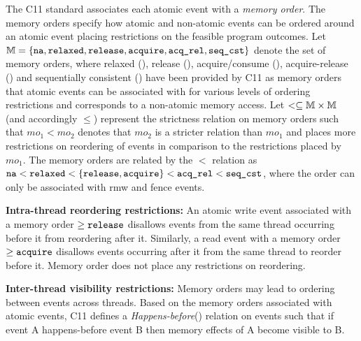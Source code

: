 The C11 standard \cite{C11} associates each atomic event with 
a {\em memory order}. The memory orders specify how atomic and
non-atomic events can be ordered around an atomic event placing
restrictions on the feasible program outcomes.
%
Let $\mathbb{M} = \{\texttt{na},\texttt{relaxed},\texttt{release},\texttt{acquire},\texttt{acq\_rel},\texttt{seq\_cst}\}$ denote the set 
of memory orders, where relaxed (\morlx), release (\morel),
acquire/consume (\moacq), acquire-release (\moar) and sequentially
consistent (\mosc) have been provided by C11 as memory orders that 
atomic events can be associated with for various levels
of ordering restrictions and \na corresponds to a non-atomic
memory access.
%
Let $< \subseteq \mathbb{M} \times \mathbb{M}$ (and accordingly $\le$) 
represent the strictness relation on memory orders such that 
$mo_1 < mo_2$ denotes that $mo_2$ is a stricter relation than 
$mo_1$ and places more restrictions on reordering of events in 
comparison to the restrictions placed by $mo_1$. 
%
The memory orders are related by the $<$ relation as $\texttt{na} < \texttt{relaxed}
< \{\texttt{release},\texttt{acquire}\} < \texttt{acq\_rel} < \texttt{seq\_cst}$, where the order \moar can only be
associated with rmw and fence events.

\noindent
{\bf Intra-thread reordering restrictions:} 
An atomic write event associated
with a memory order  $\ge \texttt{release}$ disallows events from the same 
thread occurring before it from reordering after it. 
%
Similarly, a read event with a memory order $\ge \texttt{acquire}$ disallows
events occurring after it from the same thread to reorder before it.
%
Memory order \morlx does not place any restrictions on reordering.

\noindent
{\bf Inter-thread visibility restrictions:}
Memory orders may lead to ordering between events across threads. 
Based on the memory orders associated with atomic events, 
C11 defines a {\em Happens-before}(\setHB) relation on events such 
that if event A happens-before event B then memory effects of A 
become visible to B.